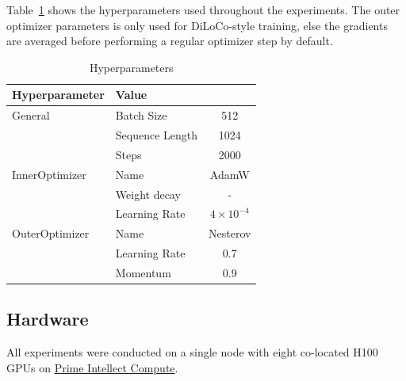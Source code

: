 \documentclass{article}
\begin{document}
Table~\ref{tab:hyperparameters} shows the hyperparameters used throughout the
experiments. The outer optimizer parameters is only used for DiLoCo-style
training, else the gradients are averaged before performing a regular optimizer
step by default.

\begin{table}[ht]
\centering
\begin{tabular}{llc}
\toprule
\textbf{Hyperparameter} & \textbf{Value} \\ 
\midrule
\multirow{1}{*}{General} & Batch Size & 512 \\ 
& Sequence Length & 1024 \\ 
& Steps & 2000 \\
\hline
\multirow{1}{*}{InnerOptimizer} & Name & AdamW \\ 
& Weight decay & - \\ 
& Learning Rate & $4 \times 10^{-4}$ \\ 
\hline
\multirow{1}{*}{OuterOptimizer} & Name & Nesterov \\ 
& Learning Rate & 0.7 \\ 
& Momentum & 0.9 \\ 
\bottomrule
\end{tabular}
\caption{Hyperparameters}
\label{tab:hyperparameters}
\end{table}

\subsection{Hardware}

All experiments were conducted on a single node with eight co-located H100 GPUs
on \href{https://app.primeintellect.com/}{Prime Intellect Compute}.
\end{document}
